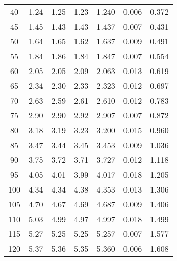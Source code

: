 \begin{table}[H]
{\begin{tabular}{
      S[table-format=3.0] 
      S[table-format=1.3] S[table-format=1.3] S[table-format=1.3]
      S[table-format=1.4] S[table-format=1.4] S[table-format=1.3]
      }
      40    & 1.24  & 1.25  & 1.23  & 1.240  & 0.006  & 0.372  \\
      45    & 1.45  & 1.43  & 1.43  & 1.437  & 0.007  & 0.431  \\
      50    & 1.64  & 1.65  & 1.62  & 1.637  & 0.009  & 0.491  \\
      55    & 1.84  & 1.86  & 1.84  & 1.847  & 0.007  & 0.554  \\
      60    & 2.05  & 2.05  & 2.09  & 2.063  & 0.013  & 0.619  \\
      65    & 2.34  & 2.30  & 2.33  & 2.323  & 0.012  & 0.697  \\
      70    & 2.63  & 2.59  & 2.61  & 2.610  & 0.012  & 0.783  \\
      75    & 2.90  & 2.90  & 2.92  & 2.907  & 0.007  & 0.872  \\
      80    & 3.18  & 3.19  & 3.23  & 3.200  & 0.015  & 0.960  \\
      85    & 3.47  & 3.44  & 3.45  & 3.453  & 0.009  & 1.036  \\
      90    & 3.75  & 3.72  & 3.71  & 3.727  & 0.012  & 1.118  \\
      95    & 4.05  & 4.01  & 3.99  & 4.017  & 0.018  & 1.205  \\
      100   & 4.34  & 4.34  & 4.38  & 4.353  & 0.013  & 1.306  \\
      105   & 4.70  & 4.67  & 4.69  & 4.687  & 0.009  & 1.406  \\
      110   & 5.03  & 4.99  & 4.97  & 4.997  & 0.018  & 1.499  \\
      115   & 5.27  & 5.25  & 5.25  & 5.257  & 0.007  & 1.577  \\
      120   & 5.37  & 5.36  & 5.35  & 5.360  & 0.006  & 1.608  \\
      \bottomrule 
    \end{tabular}
    }
\end{table}
%
